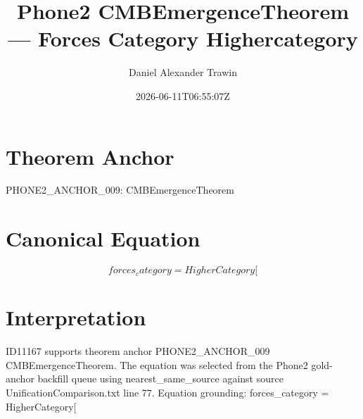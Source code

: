 \documentclass[11pt]{article}
\title{Phone2 CMBEmergenceTheorem — Forces Category Highercategory}
\author{Daniel Alexander Trawin}
\date{2026-06-11T06:55:07Z}
\begin{document}
\maketitle
\section*{Theorem Anchor}
PHONE2_ANCHOR_009: CMBEmergenceTheorem
\section*{Canonical Equation}
\[
forces_category = HigherCategory[
\]
\section*{Interpretation}
ID11167 supports theorem anchor PHONE2_ANCHOR_009 CMBEmergenceTheorem. The equation was selected from the Phone2 gold-anchor backfill queue using nearest_same_source against source UnificationComparison.txt line 77. Equation grounding: forces_category = HigherCategory[
\end{document}
